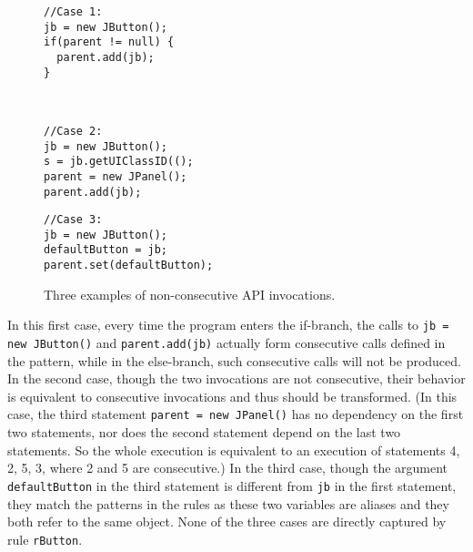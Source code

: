 \documentclass[a4paper, USenglish]{lipics-v2016}
\newenvironment{smpage}[1]
{\begin{lrbox}{\fmbox}\begin{minipage}{#1}}
{\end{minipage}\end{lrbox}\usebox{\fmbox}}
\newcommand{\code}[1]{\texttt{\footnotesize #1}}
\theoremstyle{plain}
\begin{document}
\begin{figure}
\begin{center}
\begin{smpage}{0.3\columnwidth}
\begin{lstlisting}[style=java,frame=none, basicstyle=\scriptsize\ttfamily]
//Case 1:
jb = new JButton();
if(parent != null) {
  parent.add(jb);
}
\end{lstlisting}
\end{smpage}
~~
\begin{smpage}{0.3\columnwidth}
\begin{lstlisting}[style=java,frame=none, basicstyle=\scriptsize\ttfamily]
//Case 2:
jb = new JButton();
s = jb.getUIClassID(();
parent = new JPanel();
parent.add(jb);
\end{lstlisting}
\end{smpage}
\begin{smpage}{0.3\columnwidth}
\begin{lstlisting}[style=java,frame=none, basicstyle=\scriptsize\ttfamily]
//Case 3:
jb = new JButton();
defaultButton = jb;
parent.set(defaultButton);
\end{lstlisting}
\end{smpage}
\end{center}
\vspace{-15pt}
\caption{Three examples of non-consecutive API invocations.}
\label{eg:intro:3cases}
\vspace{-12pt}
\end{figure}

In this first case, every time the program enters the if-branch,
the calls to \code{jb = new JButton()} and \code{parent.add(jb)}
actually form consecutive calls defined in the pattern, while in the
else-branch, such consecutive calls will not be produced. In the second case, 
though the two invocations are not consecutive, their behavior is
equivalent to consecutive invocations and thus should be transformed. (In this case, the third statement \code{parent = new JPanel()} has no dependency on the first two statements, nor does the second statement
depend on the last two statements. So the whole execution is
equivalent to an execution of statements 4, 2, 5, 3, where 2 and 5 are
consecutive.)
 In the third case, though the argument
\code{defaultButton} in the third statement is different from
\code{jb} in the first statement, they match the
patterns in the rules as these two variables are aliases and they both
refer to the same object. None of the three cases are directly captured by
rule \code{rButton}.
\end{document}

